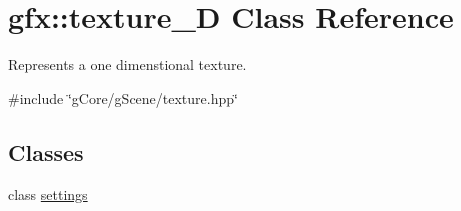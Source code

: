 \hypertarget{classgfx_1_1texture__1D}{\section{gfx\-:\-:texture\-\_\-D Class Reference}
\label{classgfx_1_1texture__1D}
}


Represents a one dimenstional texture.  




{\ttfamily \#include \char`\"{}g\-Core/g\-Scene/texture.\-hpp\char`\"{}}

\subsection*{Classes}
\begin{DoxyCompactItemize}
\item 
class \hyperlink{classgfx_1_1texture__1D_1_1settings}{settings}
\end{DoxyCompactItemize}
